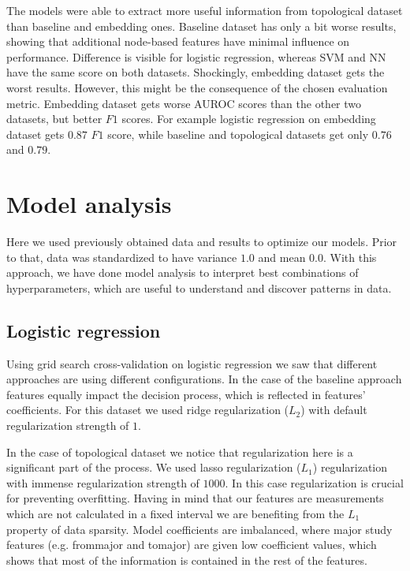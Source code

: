 \documentclass[9pt,twocolumn,twoside]{pnas-new}
\begin{document}
The models were able to extract more useful information from topological dataset than baseline and embedding ones. Baseline dataset has only a bit worse results, showing that additional node-based features have minimal influence on performance. Difference is visible for logistic regression, whereas SVM and NN have the same score on both datasets. Shockingly, embedding dataset gets the worst results. However, this might be the consequence of the chosen evaluation metric. Embedding dataset gets worse AUROC scores than the other two datasets, but better $F1$ scores. For example logistic regression on embedding dataset gets $0.87$ $F1$ score, while baseline and topological datasets get only $0.76$ and $0.79$.












\section*{Model analysis}

Here we used previously obtained data and results to optimize our models. Prior to that, data was standardized to have variance $1.0$ and mean $0.0$. With this approach, we have done model analysis to interpret best combinations of hyperparameters, which are useful to understand and discover patterns in data.

\subsection*{Logistic regression}

Using grid search cross-validation on logistic regression we saw that different approaches are using different configurations. In the case of the baseline approach features equally impact the decision process, which is reflected in features' coefficients. For this dataset we used ridge regularization ($L_2$) with default regularization strength of $1$.

In the case of topological dataset we notice that regularization here is a significant part of the process. We used lasso regularization ($L_1$) regularization with immense regularization strength of $1000$. In this case regularization is crucial for preventing overfitting. Having in mind that our features are measurements which are not calculated in a fixed interval we are benefiting from the $L_1$ property of data sparsity. Model coefficients are imbalanced, where major study features (e.g. from\textunderscore major and to\textunderscore major) are given low coefficient values, which shows that most of the information is contained in the rest of the features.
\end{document}
